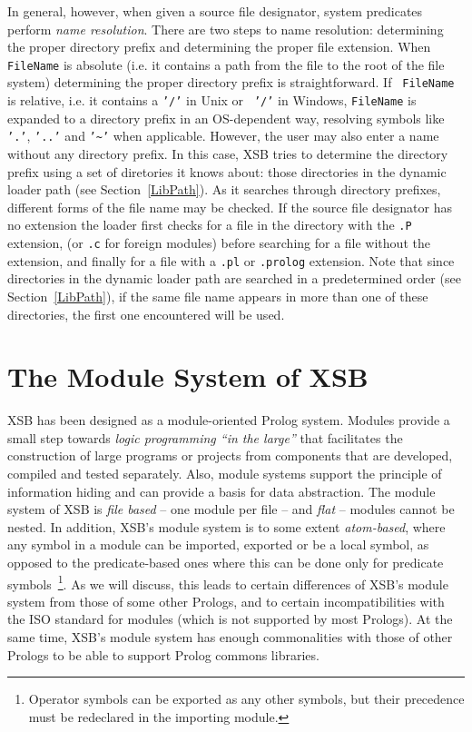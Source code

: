 In general, however, when given a source file designator, system
predicates perform {\em name resolution}.  There are two steps to name
resolution: determining the proper directory prefix and determining
the proper file extension.  When {\tt FileName} is absolute (i.e. it
contains a path from the file to the root of the file system)
determining the proper directory prefix is straightforward.  If {\tt
  FileName} is relative, i.e. it contains a {\tt '/'} in Unix or {\tt
  '/'} in Windows, {\tt FileName} is expanded to a directory prefix in
an OS-dependent way, resolving symbols like {\tt '.'}, {\tt '..'} and
{\tt '\~{}'} when applicable.  However, the user may also enter a name
without any directory prefix. In this case, XSB tries to determine the
directory prefix using a set of diretories it knows about: those
directories in the dynamic loader path (see Section~\ref{LibPath}).
As it searches through directory prefixes, different forms of the file
name may be checked.  If the source file designator has no extension
the loader first checks for a file in the directory with the {\tt .P}
extension, (or {\tt .c} for foreign modules) before searching for a
file without the extension, and finally for a file with a {\tt .pl} or {\tt .prolog}
extension.  Note that since directories in the dynamic loader path are
searched in a predetermined order (see Section~\ref{LibPath}), if the
same file name appears in more than one of these directories, the
first one encountered will be used.

\section{The Module System of XSB} \label{Modules}
XSB has been designed as a module-oriented Prolog system.  Modules
provide a small step towards {\em logic programming ``in the large''}
that facilitates the construction of large programs or projects from
components that are developed, compiled and tested separately.  Also,
module systems support the principle of information hiding and can
provide a basis for data abstraction.  The module system of XSB is
{\em file based} -- one module per file -- and {\em flat} -- modules
cannot be nested.  In addition, XSB's module system is to some extent
{\em atom-based}, where any symbol in a module can be imported,
exported or be a local symbol, as opposed to the predicate-based ones
where this can be done only for predicate symbols~\footnote{Operator
  symbols can be exported as any other symbols, but their precedence
  must be redeclared in the importing module.}.  As we will discuss,
this leads to certain differences of XSB's module system from those of
some other Prologs, and to certain incompatibilities with the ISO
standard for modules (which is not supported by most Prologs).  At the
same time, XSB's module system has enough commonalities with those of
other Prologs to be able to support Prolog commons libraries.

